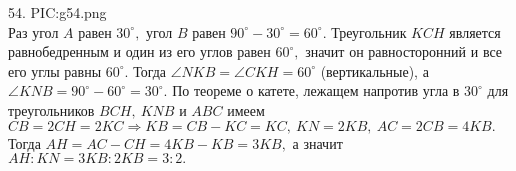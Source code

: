 54. {{PIC:g54.png}}\\
Раз угол $A$ равен $30^\circ,$ угол $B$ равен $90^\circ-30^\circ=60^\circ.$ Треугольник $KCH$ является равнобедренным и один из его углов равен $60^\circ,$ значит он равносторонний и все его углы равны $60^\circ.$ Тогда $\angle NKB=\angle CKH=60^\circ$ (вертикальные), а $\angle KNB=90^\circ-60^\circ=30^\circ.$ По теореме о катете, лежащем напротив угла в $30^\circ$ для треугольников $BCH,\ KNB$ и $ABC$ имеем $CB=2CH=2KC\Rightarrow KB=CB-KC=KC,\ KN=2KB,\ AC=2CB=4KB.$ Тогда $AH=AC-CH=4KB-KB=3KB,$ а значит $AH:KN=3KB:2KB=3:2.$\\
